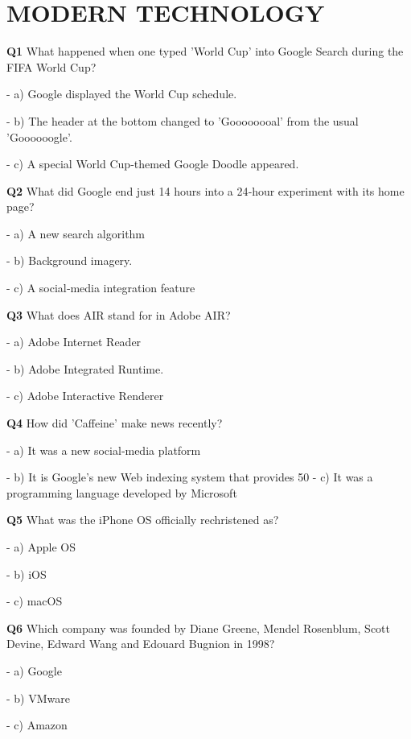 \section{MODERN TECHNOLOGY}

\textbf{Q1} What happened when one typed 'World Cup' into Google Search during the FIFA World Cup?\par
\quad - a) Google displayed the World Cup schedule.\par
\quad - b) The header at the bottom changed to 'Goooooooal' from the usual 'Goooooogle'.\par
\quad - c) A special World Cup‑themed Google Doodle appeared.\par

\textbf{Q2} What did Google end just 14 hours into a 24‑hour experiment with its home page?\par
\quad - a) A new search algorithm\par
\quad - b) Background imagery.\par
\quad - c) A social‑media integration feature\par

\textbf{Q3} What does AIR stand for in Adobe AIR?\par
\quad - a) Adobe Internet Reader\par
\quad - b) Adobe Integrated Runtime.\par
\quad - c) Adobe Interactive Renderer\par

\textbf{Q4} How did 'Caffeine' make news recently?\par
\quad - a) It was a new social‑media platform\par
\quad - b) It is Google's new Web indexing system that provides 50 %
\quad - c) It was a programming language developed by Microsoft\par

\textbf{Q5} What was the iPhone OS officially rechristened as?\par
\quad - a) Apple OS\par
\quad - b) iOS\par
\quad - c) macOS\par

\textbf{Q6} Which company was founded by Diane Greene, Mendel Rosenblum, Scott Devine, Edward Wang and Edouard Bugnion in 1998?\par
\quad - a) Google\par
\quad - b) VMware\par
\quad - c) Amazon\par

